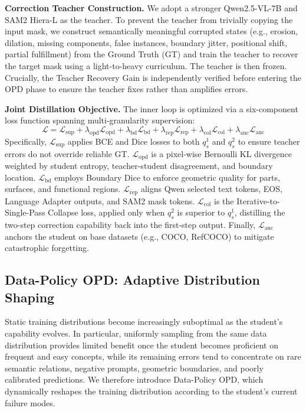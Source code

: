 \noindent\textbf{Correction Teacher Construction.} We adopt a stronger Qwen2.5-VL-7B and SAM2 Hiera-L as the teacher. To prevent the teacher from trivially copying the input mask, we construct semantically meaningful corrupted states (e.g., erosion, dilation, missing components, false instances, boundary jitter, positional shift, partial fulfillment) from the Ground Truth (GT) and train the teacher to recover the target mask using a light-to-heavy curriculum. The teacher is then frozen. Crucially, the Teacher Recovery Gain is independently verified before entering the OPD phase to ensure the teacher fixes rather than amplifies errors.

\noindent\textbf{Joint Distillation Objective.} The inner loop is optimized via a six-component loss function spanning multi-granularity supervision:
\begin{equation}
    \mathcal{L} = \mathcal{L}_{\mathrm{sup}} + \lambda_{\mathrm{opd}} \mathcal{L}_{\mathrm{opd}} + \lambda_{\mathrm{bd}} \mathcal{L}_{\mathrm{bd}} + \lambda_{\mathrm{rep}} \mathcal{L}_{\mathrm{rep}} + \lambda_{\mathrm{col}} \mathcal{L}_{\mathrm{col}} + \lambda_{\mathrm{anc}} \mathcal{L}_{\mathrm{anc}}
\end{equation}
Specifically, $\mathcal{L}_{\mathrm{sup}}$ applies BCE and Dice losses to both $q_s^1$ and $q_s^2$ to ensure teacher errors do not override reliable GT. $\mathcal{L}_{\mathrm{opd}}$ is a pixel-wise Bernoulli KL divergence weighted by student entropy, teacher-student disagreement, and boundary location. $\mathcal{L}_{\mathrm{bd}}$ employs Boundary Dice to enforce geometric quality for parts, surfaces, and functional regions. $\mathcal{L}_{\mathrm{rep}}$ aligns Qwen selected text tokens, EOS, Language Adapter outputs, and SAM2 mask tokens. $\mathcal{L}_{\mathrm{col}}$ is the Iterative-to-Single-Pass Collapse loss, applied only when $q_s^2$ is superior to $q_s^1$, distilling the two-step correction capability back into the first-step output. Finally, $\mathcal{L}_{\mathrm{anc}}$ anchors the student on base datasets (e.g., COCO, RefCOCO) to mitigate catastrophic forgetting.
\subsection{Data-Policy OPD: Adaptive Distribution Shaping}
\label{subsec:data_opd}

Static training distributions become increasingly suboptimal as the
student's capability evolves. In particular, uniformly sampling from the
same data distribution provides limited benefit once the student becomes
proficient on frequent and easy concepts, while its remaining errors tend
to concentrate on rare semantic relations, negative prompts, geometric
boundaries, and poorly calibrated predictions. We therefore introduce
Data-Policy OPD, which dynamically reshapes the training distribution
according to the student's current failure modes.

